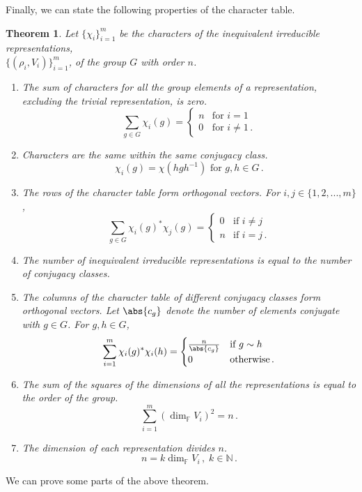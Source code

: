 \documentclass{article}
\theoremstyle{plain}\theoremheaderfont{\normalfont\itshape}\theorembodyfont{\rmfamily}\theoremseparator{.}\newtheorem*{rem}{Remark}\newtheorem*{ex}{Example}\newtheorem*{proof}{Proof}\newtheorem*{altp}{Alternative proof}
\theoremstyle{plain}\theoremheaderfont{\normalfont\bfseries}\theorembodyfont{\rmfamily}\theoremseparator{.}\newtheorem{thm}{Theorem}[section]\newtheorem{lem}[thm]{Lemma}\newtheorem{prop}[thm]{Proposition}\newtheorem*{cor}{Corollary}\newtheorem{defn}[thm]{Definition}\newtheorem{clm}[thm]{Claim}\newtheorem{clminproof}{Claim}
\theoremstyle{break}\theoremheaderfont{\normalfont\itshape}\theorembodyfont{\rmfamily}\theoremseparator{.\medskip}\newtheorem*{proofskip}{Proof}\newtheorem*{exs}{Examples}\newtheorem*{rems}{Remarks}
\theoremstyle{break}\theoremheaderfont{\normalfont\bfseries}\theorembodyfont{\rmfamily}\theoremseparator{.\medskip}\newtheorem{lemskip}[thm]{Lemma}\newtheorem{defnskip}[thm]{Definition}\newtheorem{propskip}[thm]{Proposition}\newtheorem{thmskip}[thm]{Theorem}
\numberwithin{equation}{section}
\begin{document}
	Finally, we can state the following properties of the character table.
	\begin{thm}\label{chatable}
		Let \(\{\chi_i\}_{i=1}^{m}\) be the characters of the inequivalent irreducible representations, \\\(\{(\rho_i,V_i)\}_{i=1}^{m}\), of the group \(G\) with order \(n\).
		\begin{enumerate}[topsep=0pt]
			\item The sum of characters for all the group elements of a representation, excluding the trivial representation, is zero.
			\[\sum_{g\in G}\chi_i(g)=\begin{cases}
				n & \text{for }i=1\\
				0 & \text{for }i\ne 1\,.
			\end{cases}\]
			\item Characters are the same within the same conjugacy class.
			\[\chi_i(g)=\chi(hgh^{-1})\text{ for }g,h\in G\,.\]
			\item The rows of the character table form orthogonal vectors. For \(i,j\in\{1,2,...,m\}\),
			\[\sum_{g\in G}\chi_i(g)^*\chi_j(g)=\begin{cases}
				0 & \text{if }i\ne j\\
				n & \text{if }i=j\,.
			\end{cases}\]
			\item The number of inequivalent irreducible representations is equal to the number of conjugacy classes.
			\item The columns of the character table of different conjugacy classes form orthogonal vectors. Let \(\abs{c_g}\) denote the number of elements conjugate with \(g\in G\). For \(g,h\in G\),
			\[\sum_{i=1}^{m}\chi_i(g)^*\chi_i(h)=\begin{cases}
				\frac{n}{\abs{c_g}} & \text{if }g\sim h\\
				0 & \text{otherwise}\,.
			\end{cases}\]
			\item The sum of the squares of the dimensions of all the representations is equal to the order of the group.
			\[\sum_{i=1}^{m}(\dim_\mathbb{F}V_i)^2=n\,.\]
			\item The dimension of each representation divides \(n\).
			\[n=k\dim_\mathbb{F}V_i\,,\;k\in\mathbb{N}\,.\]
		\end{enumerate}
	\end{thm}
	We can prove some parts of the above theorem.
\end{document}
